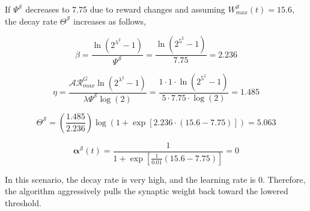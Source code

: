 If \(\Psi^{\mathcal{S}}\) decreases to 7.75 due to reward changes and assuming \(W_{max}^{\mathcal{S}}(t) = 15.6\), the decay rate \(\Theta^{\mathcal{S}}\) increases as follows,

\begin{equation*}
    \beta = \frac{\ln{(2^{\lambda^2}-1)}}{\Psi^{\mathcal{S}}} = \frac{\ln(2^{5^2} - 1)}{7.75} = 2.236
\end{equation*}

\begin{equation*}
    \eta = \frac{\mathcal{A}\mathcal{R}_{max}^{G} \ln{(2^{\lambda^2}-1)}}{\lambda\Psi^{\mathcal{S}} \log{(2)}} = \frac{1 \cdot 1 \cdot \ln(2^{5^2} - 1)}{5 \cdot 7.75 \cdot \log(2)} = 1.485
\end{equation*}

\begin{equation*}
    \Theta^{\mathcal{S}} = \left( \frac{1.485}{2.236} \right) \log \left(1 + \exp \left[2.236 \cdot (15.6 - 7.75)\right] \right) = 5.063
\end{equation*}

\begin{equation*}
    \boldsymbol{\alpha}^{\mathcal{S}}(t) = \frac{1}{1 + \exp{\left[\frac{1}{0.01}\left(15.6 - 7.75\right)\right]}} = 0
\end{equation*}

In this scenario, the decay rate is very high, and the learning rate is 0. Therefore, the algorithm aggressively pulls the synaptic weight back toward the lowered threshold.

    
    
    
